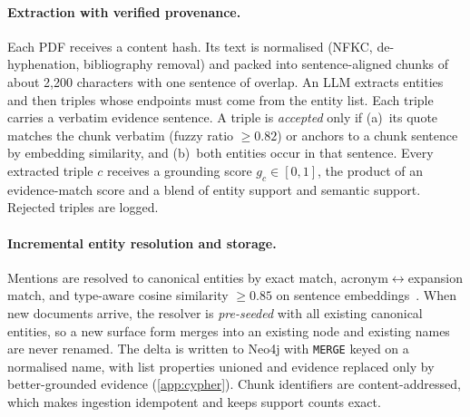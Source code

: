 \documentclass[10pt,twocolumn]{article}
\theoremstyle{remark}
\begin{document}
\paragraph{Extraction with verified provenance.}
Each PDF receives a content hash. Its text is normalised (NFKC, de-hyphenation, bibliography removal) and packed into
sentence-aligned chunks of about 2{,}200 characters with one sentence of overlap. An LLM extracts entities and then
triples whose endpoints must come from the entity list. Each triple carries a verbatim evidence sentence. A triple
is \emph{accepted} only if (a)~its quote matches the chunk verbatim (fuzzy ratio $\ge0.82$) or anchors to a chunk
sentence by embedding similarity, and (b)~both entities occur in that sentence. Every extracted triple $c$ receives a
grounding score $g_c\in[0,1]$, the product of an evidence-match score and a blend of entity support and semantic
support. Rejected triples are logged.

\paragraph{Incremental entity resolution and storage.}
Mentions are resolved to canonical entities by exact match, acronym$\leftrightarrow$expansion match, and type-aware
cosine similarity $\ge0.85$ on sentence embeddings~\cite{reimers2019sbert}. When new documents arrive, the resolver
is \emph{pre-seeded} with all existing canonical entities, so a new surface form merges into an existing node and
existing names are never renamed. The delta is written to Neo4j with \texttt{MERGE} keyed on a normalised name, with
list properties unioned and evidence replaced only by better-grounded evidence (\cref{app:cypher}). Chunk identifiers
are content-addressed, which makes ingestion idempotent and keeps support counts exact.
\end{document}
